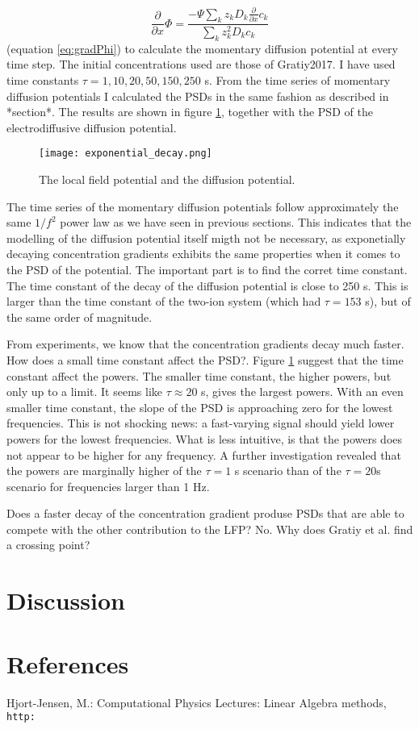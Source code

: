 \documentclass{article}
\begin{document}
\begin{equation*}
\frac{\partial}{\partial x} \Phi = \frac{-\Psi \sum_k z_k D_k \frac{\partial}{\partial x} c_k}{\sum_k z_k^2 D_k c_k}
\end{equation*}
(equation \ref{eq:gradPhi}) to calculate the momentary diffusion potential at every time step. The initial concentrations used are those of Gratiy2017. I have used time constants $\tau = 1,10,20,50, 150, 250$ s. From the time series of momentary diffusion potentials I calculated the PSDs in the same fashion as described in *section*. The results are shown in figure \ref{fig:exponential_decay}, together with the PSD of the electrodiffusive diffusion potential. 

\begin{figure}
  \texttt{[image: exponential\_decay.png]}
  \caption{The local field potential and the diffusion potential. }
  \label{fig:exponential_decay}
\end{figure}

The time series of the momentary diffusion potentials follow approximately the same $1/f^2$ power law as we have seen in previous sections. This indicates that the modelling of the diffusion potential itself migth not be necessary, as exponetially decaying concentration gradients exhibits the same properties when it comes to the PSD of the potential. The important part is to find the corret time constant. The time constant of the decay of the diffusion potential is close to 250 s. This is larger than the time constant of the two-ion system (which had $\tau = 153$ s), but of the same order of magnitude.

From experiments, we know that the concentration gradients decay much faster. How does a small time constant affect the PSD?. Figure \ref{fig:exponential_decay} suggest that the time constant affect the powers. The smaller time constant, the higher powers, but only up to a limit. It seems like $\tau \approx 20 $ s, gives the largest powers. With an even smaller time constant, the slope of the PSD is approaching zero for the lowest frequencies. This is not shocking news: a fast-varying signal should yield lower powers for the lowest frequencies. What is less intuitive, is that the powers does not appear to be higher for any frequency. A further investigation revealed that the powers are marginally higher of the $\tau = 1$ s scenario than of the $\tau = 20 $s scenario for frequencies larger than 1 Hz.

Does a faster decay of the concentration gradient produse PSDs that are able to compete with the other contribution to the LFP? No. Why does Gratiy et al. find a crossing point? 
\section{Discussion}

\section{References}

\begin{thebibliography}{1}
Hjort-Jensen, M.: Computational Physics Lectures: Linear
Algebra methods,
\\\texttt{http:}
\end{thebibliography}
\end{document}
